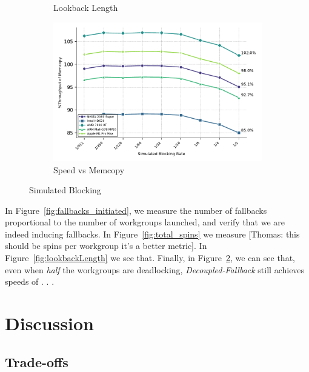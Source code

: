 \documentclass[sigconf]{acmart}
\newcommand{\thomas}[1]{{\footnotesize\color{orange}[Thomas: #1]}}
\begin{document}
\begin{figure}[htbp]
\begin{subfigure}{.9\linewidth}
    \caption{Lookback Length}
    \label{fig:lookback_length}
  \end{subfigure}
  \begin{subfigure}{.9\linewidth}
    \centering
    \includegraphics[width=\linewidth]{graphics/time_plot.pdf}
    \caption{Speed vs Memcopy}
    \label{fig:execution_time}
  \end{subfigure}
  \caption{Simulated Blocking}
  \label{fig:vertical_images}
\end{figure}

In Figure~\ref{fig:fallbacks_initiated}, we measure the number of fallbacks proportional to the number of workgroups launched, and verify that we are indeed inducing fallbacks. In Figure~\ref{fig:total_spins} we measure \thomas{this should be spins per workgroup it's a better metric}. In Figure~\ref{fig:lookbackLength} we see that. Finally, in Figure~\ref{fig:execution_time}, we can see that, even when \emph{half} the workgroups are deadlocking, \emph{Decoupled-Fallback} still achieves speeds of . . .

\section{Discussion}

\subsection{Trade-offs}
\end{document}
